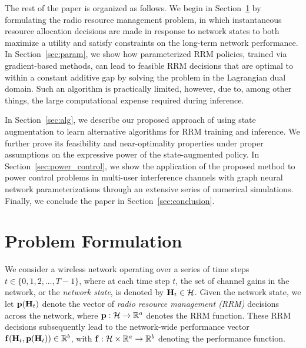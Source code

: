 \documentclass[lettersize,journal]{IEEEtran}
\begin{document}
The rest of the paper is organized as follows. We begin in Section~\ref{sec:formulation} by formulating the radio resource management problem, in which instantaneous resource allocation decisions are made in response to network states to both maximize a utility and satisfy constraints on the long-term network performance. In Section~\ref{sec:param}, we show how parameterized RRM policies, trained via gradient-based methods, can lead to feasible RRM decisions that are optimal to within a constant additive gap by solving the problem in the Lagrangian dual domain. Such an algorithm is practically limited, however, due to, among other things, the large computational expense required during inference. 

In Section~\ref{sec:alg}, we describe our proposed approach of using state augmentation to learn alternative algorithms for RRM training and inference. We further prove its feasibility and near-optimality properties under proper assumptions on the expressive power of the state-augmented policy. In Section~\ref{sec:power_control}, we show the application of the proposed method to power control problems in multi-user interference channels with graph neural network parameterizations through an extensive series of numerical simulations. Finally, we conclude the paper in Section~\ref{sec:conclusion}.


\section{Problem Formulation}\label{sec:formulation}
We consider a wireless network operating over a series of time steps $t\in\{0,1,2,\dots,T-1\}$, where at each time step $t$, the set of channel gains in the network, or the \emph{network state}, is denoted by ${\mathbf H}_t \in {\ensuremath{\mathcal H}}$. Given the network state, we let ${\mathbf p}({\mathbf H}_t)$ denote the vector of \emph{radio resource management (RRM)} decisions across the network, where ${\mathbf p} : {\mathcal H} \to {\mathbb R}^a$ denotes the RRM function. These RRM decisions subsequently lead to the network-wide performance vector ${\mathbf f}({\mathbf H}_t, {\mathbf p}({\mathbf H}_t)) \in {\mathbb R}^b$, with ${\mathbf f}: {\mathcal H} \times {\mathbb R}^a \to {\mathbb R}^b$ denoting the performance function.
\end{document}
